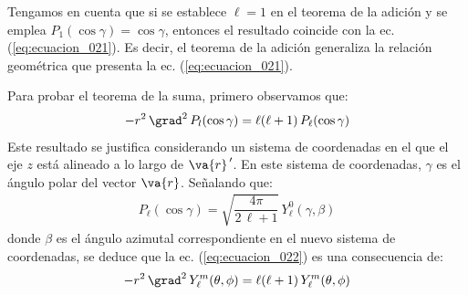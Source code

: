 Tengamos en cuenta que si se establece $\ell = 1$ en el teorema de la adición y se emplea $P_{1} (\cos \gamma) = \cos \gamma$, entonces el resultado coincide con la ec. (\ref{eq:ecuacion_021}). Es decir, el teorema de la adición generaliza la relación geométrica que presenta la ec. (\ref{eq:ecuacion_021}).
\par
Para probar el teorema de la suma, primero observamos que:
\begin{align}
- r^{2} \, \grad^{2} \, P_{l} (\cos \gamma) = \ell ( \ell + 1) \, P_{\ell} (\cos \gamma)
\label{eq:ecuacion_022}
\end{align}
Este resultado se justifica considerando un sistema de coordenadas en el que el eje $z$ está alineado a lo largo de $\va{r}^{\, \prime}$. En este sistema de coordenadas, $\gamma$ es el ángulo polar del vector $\va{r}$. Señalando que:
\begin{align*}
P_{\ell} (\cos \gamma) = \sqrt{\dfrac{4 \pi}{2 \, \ell + 1}} \, Y_{\ell}^{0} (\gamma, \beta)
\end{align*}
donde $\beta$ es el ángulo azimutal correspondiente en el nuevo sistema de coordenadas, se deduce que la ec. (\ref{eq:ecuacion_022}) es una consecuencia de:
\begin{align}
-r^{2} \, \grad^{2} \, Y_{\ell}^{m} (\theta, \phi) = \ell (\ell + 1) \, Y_{\ell}^{m} (\theta, \phi)
\label{eq:ecuacion_015}
\end{align}


